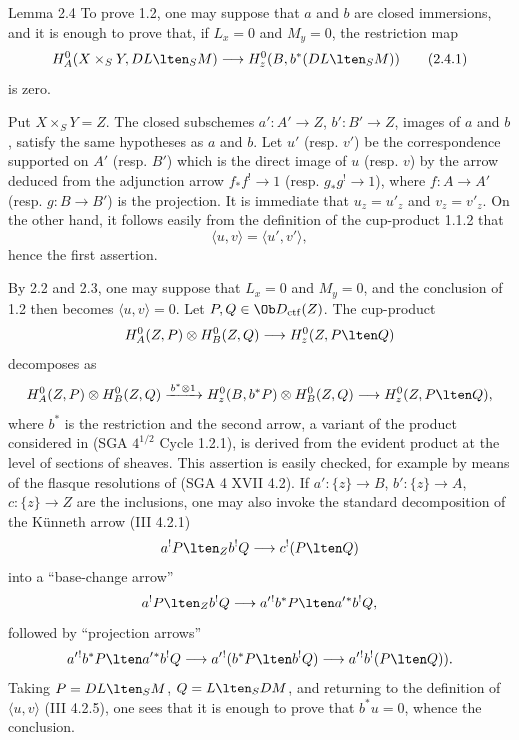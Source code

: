 \begin{statement}{Lemma 2.4}
To prove 1.2, one may suppose that $a$ and $b$ are closed immersions, and it is enough to prove that, if $L_x=0$ and $M_y=0$, the restriction map
\begin{equation}
H_A^0(X\times_SY,DL\lten_SM)
 \longrightarrow H_z^0(B,b^*(DL\lten_SM))
\tag{2.4.1}
\end{equation}
is zero.
\end{statement}

Put $X\times_SY=Z$. The closed subschemes $a':A'\to Z$, $b':B'\to Z$, images of $a$ and $b$, satisfy the same hypotheses as $a$ and $b$. Let $u'$ (resp. $v'$) be the correspondence supported on $A'$ (resp. $B'$) which is the direct image of $u$ (resp. $v$) by the arrow deduced from the adjunction arrow $f_*f^!\to1$ (resp. $g_*g^!\to1$), where $f:A\to A'$ (resp. $g:B\to B'$) is the projection. It is immediate that $u_z=u'_z$ and $v_z=v'_z$. On the other hand, it follows easily from the definition of the cup-product 1.1.2 that
\[
\langle u,v\rangle=\langle u',v'\rangle,
\]
hence the first assertion.

By 2.2 and 2.3, one may suppose that $L_x=0$ and $M_y=0$, and the conclusion of 1.2 then becomes $\langle u,v\rangle=0$. Let $P,Q\in\Ob D_{\mathrm{ctf}}(Z)$. The cup-product
\[
H_A^0(Z,P)\otimes H_B^0(Z,Q)\longrightarrow H_z^0(Z,P\lten Q)
\]
decomposes as
\[
H_A^0(Z,P)\otimes H_B^0(Z,Q)
 \xrightarrow{\,b^*\otimes 1\,}
H_z^0(B,b^*P)\otimes H_B^0(Z,Q)
 \longrightarrow H_z^0(Z,P\lten Q),
\]
where $b^*$ is the restriction and the second arrow, a variant of the product considered in (SGA $4^{1/2}$ Cycle 1.2.1), is derived from the evident product at the level of sections of sheaves. This assertion is easily checked, for example by means of the flasque resolutions of (SGA 4 XVII 4.2). If $a':\{z\}\to B$, $b':\{z\}\to A$, $c:\{z\}\to Z$ are the inclusions, one may also invoke the standard decomposition of the Künneth arrow (III 4.2.1)
\[
a^!P\lten_Z b^!Q\longrightarrow c^!(P\lten Q)
\]
into a ``base-change arrow''
\[
a^!P\lten_Z b^!Q\longrightarrow a'{}^!b^*P\lten a'{}^*b^!Q,
\]
followed by ``projection arrows''
\[
a'{}^!b^*P\lten a'{}^*b^!Q
 \longrightarrow a'{}^!(b^*P\lten b^!Q)
 \longrightarrow a'{}^!b^!(P\lten Q)).
\]
Taking $P=DL\lten_SM$, $Q=L\lten_SDM$, and returning to the definition of $\langle u,v\rangle$ (III 4.2.5), one sees that it is enough to prove that $b^*u=0$, whence the conclusion.

